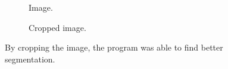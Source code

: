 \documentclass[
  digital,     %
  oneside,     %
  nosansbold,  %
  nocolorbold, %
  lof,         %
  lot,         %
]{fithesis4}
\begin{document}
\begin{figure}
    \begin{subfigure}[t]{0.3\textwidth}
        \caption{Image.}
    \end{subfigure}
    \begin{subfigure}[t]{0.3\textwidth}
        \caption{Cropped image.}
    \end{subfigure}
    \caption{By cropping the image, the program was able to find better segmentation.}
    \label{fig:issues-cropping}
\end{figure}
\end{document}
